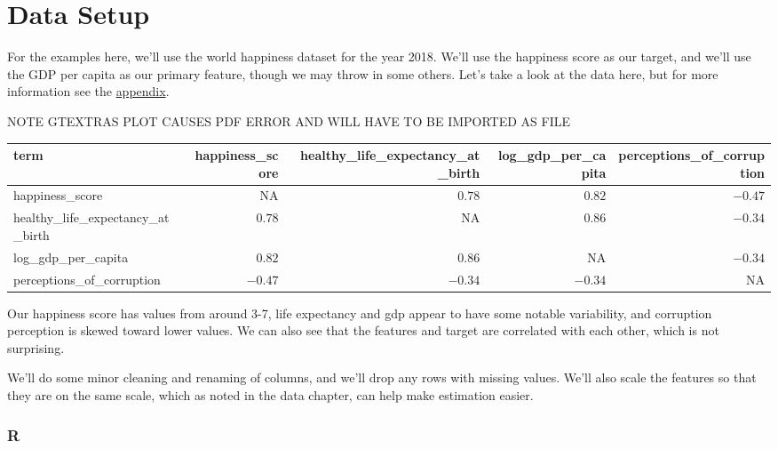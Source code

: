 \documentclass[
  letterpaper,
]{krantz}
\begin{document}
\section{Data Setup}\label{data-setup}

For the examples here, we'll use the world happiness dataset for the
year 2018. We'll use the happiness score as our target, and we'll use
the GDP per capita as our primary feature, though we may throw in some
others. Let's take a look at the data here, but for more information see
the \hyperref[appendix]{appendix}.

NOTE GTEXTRAS PLOT CAUSES PDF ERROR AND WILL HAVE TO BE IMPORTED AS FILE

\begin{longtable*}{lrrrr}
\toprule
term & happiness\_score & healthy\_life\_expectancy\_at\_birth & log\_gdp\_per\_capita & perceptions\_of\_corruption \\ 
\midrule
happiness\_score & NA & $0.78$ & $0.82$ & $-0.47$ \\ 
healthy\_life\_expectancy\_at\_birth & $0.78$ & NA & $0.86$ & $-0.34$ \\ 
log\_gdp\_per\_capita & $0.82$ & $0.86$ & NA & $-0.34$ \\ 
perceptions\_of\_corruption & $-0.47$ & $-0.34$ & $-0.34$ & NA \\ 
\bottomrule
\end{longtable*}

Our happiness score has values from around 3-7, life expectancy and gdp
appear to have some notable variability, and corruption perception is
skewed toward lower values. We can also see that the features and target
are correlated with each other, which is not surprising.

We'll do some minor cleaning and renaming of columns, and we'll drop any
rows with missing values. We'll also scale the features so that they are
on the same scale, which as noted in the data chapter, can help make
estimation easier.

\subsubsection{R}
\end{document}

